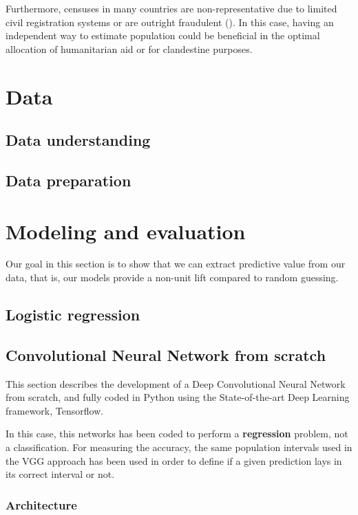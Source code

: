 \documentclass{article}
\begin{document}
Furthermore, censuses in many countries are non-representative due to limited civil registration systems or are outright fraudulent (\cite{BDYPHN06}). In this case, having an independent way to estimate population could be beneficial in the optimal allocation of humanitarian aid or for clandestine purposes.

\section{Data}
\subsection{Data understanding}

\subsection{Data preparation}
\section{Modeling and evaluation}
Our goal in this section is to show that we can extract predictive value from our data, that is, our models provide a non-unit lift compared to random guessing.
\subsection{Logistic regression}
\subsection{Convolutional Neural Network from scratch}
This section describes the development of a Deep Convolutional Neural Network from scratch, and fully coded in Python using the State-of-the-art Deep Learning framework, Tensorflow.

In this case, this networks has been coded to perform a \textbf{regression} problem, not a classification. For measuring the accuracy, the same population intervals used in the VGG approach has been used in order to define if a given prediction lays in its correct interval or not.

 \subsubsection{Architecture}
 
\end{document}
